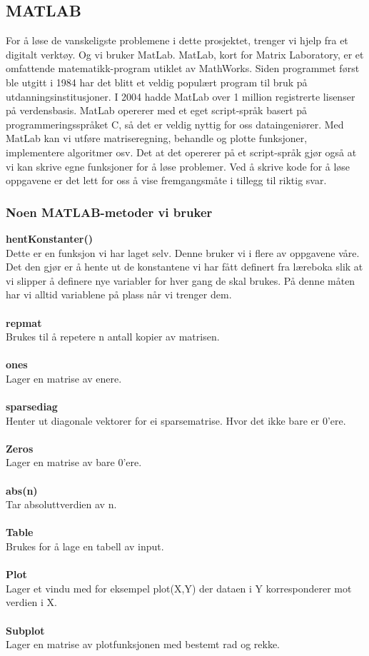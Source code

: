 \subsection{MATLAB}
For å løse de vanskeligste problemene i dette prosjektet, trenger vi hjelp fra et digitalt verktøy. Og vi bruker MatLab. MatLab, kort for Matrix Laboratory, er et omfattende matematikk-program utiklet av MathWorks. Siden programmet først ble utgitt i 1984 har det blitt et veldig populært program til bruk på utdanningsinstitusjoner. I 2004 hadde MatLab over 1 million registrerte lisenser på verdensbasis.
MatLab opererer med et eget script-språk basert på programmeringsspråket C, så det er veldig nyttig for oss dataingeniører. Med MatLab kan vi utføre matriseregning, behandle og plotte funksjoner, implementere algoritmer osv. Det at det opererer på et script-språk gjør også at vi kan skrive egne funksjoner for å løse problemer. Ved å skrive kode for å løse oppgavene er det lett for oss å vise fremgangsmåte i tillegg til riktig svar.
\subsubsection{Noen MATLAB-metoder vi bruker}
\textbf{hentKonstanter()}\\
Dette er en funksjon vi har laget selv. Denne bruker vi i flere av oppgavene våre. Det den gjør er å hente ut de konstantene vi har fått definert fra læreboka slik at vi slipper å definere nye variabler for hver gang de skal brukes. På denne måten har vi alltid variablene på plass når vi trenger dem.\\
\\
\textbf{repmat}\\
Brukes til å repetere n antall kopier av matrisen.\\
\\
\textbf{ones}\\
Lager en matrise av enere.\\
\\
\textbf{sparsediag}\\
Henter ut diagonale vektorer for ei sparsematrise. Hvor det ikke bare er 0’ere.\\
\\
\textbf{Zeros}\\
Lager en matrise av bare 0’ere.\\
\\
\textbf{abs(n)}\\
Tar absoluttverdien av n.\\
\\
\textbf{Table}\\
Brukes for å lage en tabell av input.\\
\\
\textbf{Plot}\\
Lager et vindu med for eksempel plot(X,Y) der dataen i Y korresponderer mot verdien i X.\\
\\
\textbf{Subplot}\\
Lager en matrise av plotfunksjonen med bestemt rad og rekke.

